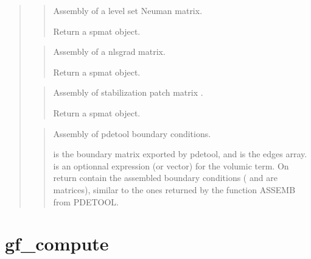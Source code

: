 \documentclass[a4paper,11pt,english]{sphinxmanual}
\begin{document}
\begin{quote}
\sphinxAtStartPar
{}
\begin{quote}

\sphinxAtStartPar
Assembly of a level set Neuman  matrix.

\sphinxAtStartPar
Return a spmat object.
\end{quote}

\sphinxAtStartPar
{}
\begin{quote}

\sphinxAtStartPar
Assembly of a nlsgrad matrix.

\sphinxAtStartPar
Return a spmat object.
\end{quote}

\sphinxAtStartPar
{}
\begin{quote}

\sphinxAtStartPar
Assembly of stabilization patch matrix .

\sphinxAtStartPar
Return a spmat object.
\end{quote}

\sphinxAtStartPar
{}
\begin{quote}

\sphinxAtStartPar
Assembly of pdetool boundary conditions.

\sphinxAtStartPar
{} is the boundary matrix exported by pdetool, and  is the
edges array.  is an optionnal expression (or vector) for
the volumic term. On return  contain the assembled
boundary conditions ( and  are matrices), similar to the
ones returned by the function ASSEMB from PDETOOL.
\end{quote}
\end{quote}


\section{gf\_compute}
\label{\detokenize{matlab_octave/cmdref_gf_compute:gf-compute}}\label{\detokenize{matlab_octave/cmdref_gf_compute::doc}}
\sphinxAtStartPar
{}
\end{document}
